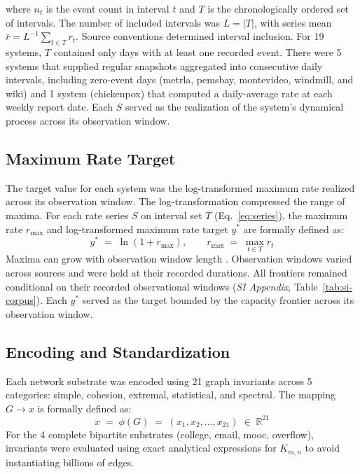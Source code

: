 \documentclass{article}
\begin{document}
where $n_{t}$ is the event count in interval $t$ and $T$ is the chronologically ordered set of intervals. The number of included intervals was $L = \lvert T \rvert$, with series mean $\bar{r} = L^{-1}\sum_{t \in T} r_t$. Source conventions determined interval inclusion. For 19 systems, $T$ contained only days with at least one recorded event. There were 5 systems that supplied regular snapshots aggregated into consecutive daily intervals, including zero-event days (metrla, pemsbay, montevideo, windmill, and wiki) and 1 system (chickenpox) that computed a daily-average rate at each weekly report date. Each $S$ served as the realization of the system's dynamical process across its observation window.

\subsection*{Maximum Rate Target}
The target value for each system was the log-transformed maximum rate realized across its observation window. The log-transformation compressed the range of maxima. For each rate series $S$ on interval set $T$ (Eq.~\eqref{eq:series}), the maximum rate $r_{\max}$ and log-transformed maximum rate target $y^*$ are formally defined as:
\begin{equation}
    y^{*} \;=\; \ln\!\left(1 + r_{\max}\right),
    \qquad
    r_{\max} \;=\; \max_{t \in T} r_t
\label{eq:maximum}
\end{equation}
Maxima can grow with observation window length \citep{ref58,ref59,ref60}. Observation windows varied across sources and were held at their recorded durations. All frontiers remained conditional on their recorded observational windows (\textit{SI Appendix}, Table~\ref{tab:si-corpus}). Each $y^*$ served as the target bounded by the capacity frontier across its observation window.

\subsection*{Encoding and Standardization}
\label{sec:encoding}
Each network substrate was encoded using 21 graph invariants across 5 categories: simple, cohesion, extremal, statistical, and spectral. The mapping $G \to x$ is formally defined as:
\begin{equation}
    x \;=\; \phi(G) \;=\; (x_1, x_2, \ldots, x_{21}) \;\in\; \mathbb{R}^{21}
\label{eq:invariants}
\end{equation}
For the 4 complete bipartite substrates (college, email, mooc, overflow), invariants were evaluated using exact analytical expressions for $K_{m,n}$ to avoid instantiating billions of edges.
\end{document}
